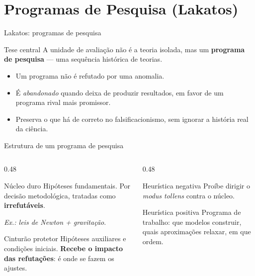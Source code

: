 \documentclass[aspectratio=169]{beamer}
\newcommand{\impt}[1]{\textcolor{maccent}{\textbf{#1}}}
\newcommand{\ntc}[1]{\textcolor{mprimary}{#1}}
\begin{document}
\section{Programas de Pesquisa (Lakatos)}

\begin{frame}{Lakatos: programas de pesquisa}
\begin{block}{Tese central}
A unidade de avalia\c c\~ao n\~ao \'e a teoria isolada, mas um \impt{programa de pesquisa} --- uma sequ\^encia hist\'orica de teorias.
\end{block}
\vspace{0.3cm}
\begin{itemize}
    \item Um programa n\~ao \'e refutado por uma anomalia.
    \item \'E \emph{abandonado} quando deixa de produzir resultados, em favor de um programa rival mais promissor.
    \item Preserva o que h\'a de correto no falsificacionismo, sem ignorar a \ntc{hist\'oria real} da ci\^encia.
\end{itemize}
\end{frame}

\begin{frame}{Estrutura de um programa de pesquisa}
\begin{columns}[T]
\begin{column}{0.48\textwidth}
\begin{block}{N\'ucleo duro}
Hip\'oteses fundamentais. Por decis\~ao metodol\'ogica, tratadas como \impt{irrefut\'aveis}.
\vspace{0.1cm}

\textit{Ex.: leis de Newton + gravita\c c\~ao}.
\end{block}
\vspace{0.2cm}
\begin{block}{Cintur\~ao protetor}
Hip\'oteses auxiliares e condi\c c\~oes iniciais. \impt{Recebe o impacto das refuta\c c\~oes}: \'e onde se fazem os ajustes.
\end{block}
\end{column}
\begin{column}{0.48\textwidth}
\begin{alertblock}{Heur\'istica negativa}
Pro\'ibe dirigir o \textit{modus tollens} contra o n\'ucleo.
\end{alertblock}
\vspace{0.2cm}
\begin{alertblock}{Heur\'istica positiva}
Programa de trabalho: que modelos construir, quais aproxima\c c\~oes relaxar, em que ordem.
\end{alertblock}
\end{column}
\end{columns}
\end{frame}
\end{document}
